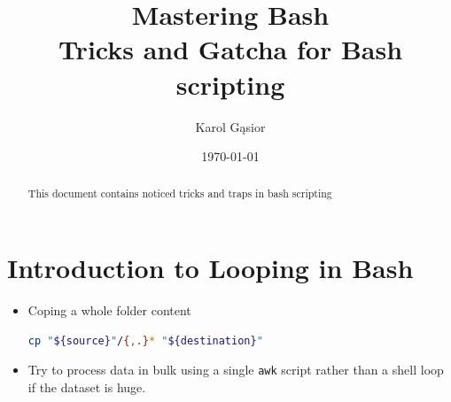 \documentclass[12pt,a4paper]{article}
\title{
	\vspace{2cm}
	\textbf{\Huge Mastering Bash}\\
	\large Tricks and Gatcha for Bash scripting
}
\author{Karol Gąsior}
\date{\today}
\begin{document}
	
	\maketitle
	\vfill
	\begin{abstract}
		This document contains noticed tricks and traps in bash scripting
	\end{abstract}
	\vfill
	\newpage
	
	\tableofcontents
	\newpage
	
	\section{Introduction to Looping in Bash}
	
	\begin{itemize}
		\item Coping a whole folder content
			\begin{lstlisting}[caption=Coping a whole directory content with hidden files, language=bash]
			cp "${source}"/{,.}* "${destination}" \end{lstlisting}
		\item Try to process data in bulk using a single \texttt{awk} script rather than a shell loop if the dataset is huge.
	\end{itemize}
	


	
\end{document}
